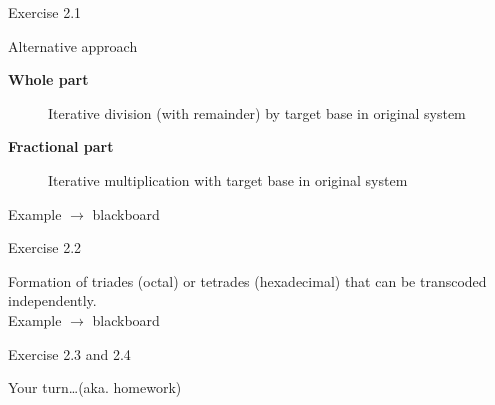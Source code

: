 \documentclass[11pt]{tudbeamer}
\begin{document}
\begin{frame}[allowframebreaks]{Exercise 2.1}
\framebreak

	\begin{block}{Alternative approach}
		\begin{description}
			\item[\textbf{Whole part}] Iterative division (with remainder) by target base in original system
			\item[\textbf{Fractional part}] Iterative multiplication with target base in original system
		\end{description}
	\end{block}
	
	Example $\rightarrow$ blackboard

\end{frame}

\begin{frame}{Exercise 2.2}

	Formation of triades (octal) or tetrades (hexadecimal) that can be transcoded independently.\\
	Example $\rightarrow$ blackboard

\end{frame}

\begin{frame}{Exercise 2.3 and 2.4}
	\centering
	
	Your turn\dots (aka. homework)

\end{frame}
\end{document}
